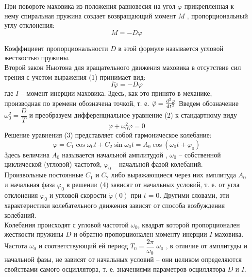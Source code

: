 \documentclass[a4paper]{article}
\begin{document}
При повороте маховика из положения равновесия на угол $\varphi$
прикрепленная к нему спиральная пружина создает возвращающий момент $M$ , пропорциональный углу отклонения:
\begin{equation}
	M=-D\varphi
\end{equation}

Коэффициент пропорциональности $D$ в этой формуле называется угловой жесткостью пружины.\\
Второй закон Ньютона для вращательного движения маховика
в отсутствие сил трения с учетом выражения (1) принимает вид:
\begin{equation}
	I\ddot{\varphi}=-D\varphi
\end{equation}
где $I$ – момент инерции маховика. Здесь, как это принято в
механике, производная по времени обозначена точкой, т. е. $\ddot{\varphi}=\diff[2]\varphi t$
Введем обозначение $\omega_0^2=\dfrac{D}{T}$
 и преобразуем дифференциальное
уравнение (2) к стандартному виду
\begin{equation}
	\ddot{\varphi}+\omega_0^2\varphi=0
\end{equation}
Решение уравнения (3) представляет собой гармоническое колебание:
\begin{equation}
\varphi=C_1\cos{\omega_0 t}+C_2\sin{\omega_0 t}=A_0\cos{(\omega_0 t+\varphi_0)}
\end{equation}
Здесь величина $A_0$ называется начальной амплитудой , $\omega_0$ –
собственной циклической (угловой) частотой, $\varphi_0$ – начальной фазой колебаний.\\
Произвольные постоянные $C_1$ и $C_2$ либо выражающиеся через
них амплитуда $A_0$ и начальная фаза $\varphi_0$ в решении (4) зависят
от начальных условий, т. е. от угла отклонения $\varphi_0$ и угловой
скорости $\dot{\varphi}(0)$ при $t$ = 0. Другими словами, эти характеристики
колебательного движения зависят от способа возбуждения колебаний.\\
Колебания происходят с угловой частотой $\omega_0$, квадрат которой
пропорционален жесткости пружины $D$ и обратно пропорционален моменту инерции $I$ маховика. Частота $\omega_0$ и соответствующий
ей период $T_0=\dfrac{2\pi}{\omega_0}$
$\omega_0$ , в отличие от амплитуды и начальной фазы,
не зависят от начальных условий – они целиком определяются свойствами самого осциллятора, т. е. значениями параметров
осциллятора $D$ и $I$.\\
\end{document}
